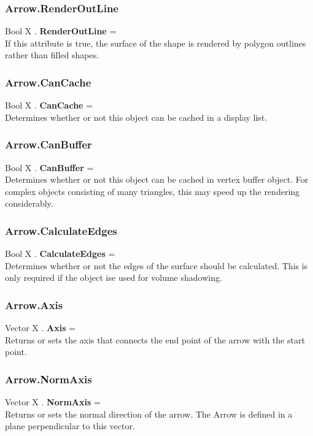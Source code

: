 \subsubsection{Arrow.RenderOutLine \label{F:Arrow:RenderOutLine}}
Bool X . \textbf{RenderOutLine} = \\
If this attribute is true, the surface of the shape is rendered by polygon outlines rather than filled shapes.

\subsubsection{Arrow.CanCache \label{F:Arrow:CanCache}}
Bool X . \textbf{CanCache} = \\
Determines whether or not this object can be cached in a display list.

\subsubsection{Arrow.CanBuffer \label{F:Arrow:CanBuffer}}
Bool X . \textbf{CanBuffer} = \\
Determines whether or not this object can be cached in vertex buffer object. For complex objects consisting of many triangles, this may speed up the rendering considerably.

\subsubsection{Arrow.CalculateEdges \label{F:Arrow:CalculateEdges}}
Bool X . \textbf{CalculateEdges} = \\
Determines whether or not the edges of the surface should be calculated. This is only required if the object ise used for volume shadowing.

\subsubsection{Arrow.Axis \label{F:Arrow:Axis}}
Vector X . \textbf{Axis} = \\
Returns or sets the axis that connects the end point of the arrow with the start point.

\subsubsection{Arrow.NormAxis \label{F:Arrow:NormAxis}}
Vector X . \textbf{NormAxis} = \\
Returns or sets the normal direction of the arrow. The Arrow is defined in a plane perpendicular to this vector.

